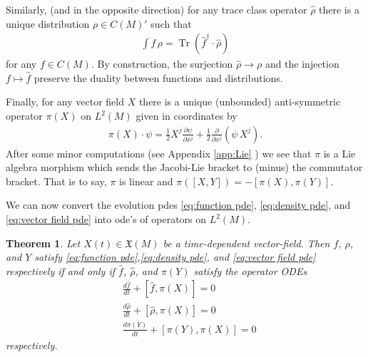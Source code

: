 \documentclass[12pt]{amsart}
\newcommand{\pder}[2]{\ensuremath{\frac{ \partial #1}{\partial #2}}}
\newtheorem{thm}{Theorem}[section]
\DeclareMathOperator{\Tr}{Tr}
\begin{document}
Similarly, (and in the opposite direction) for any trace class operator $\hat{\rho}$ there is a unique distribution $\rho \in C(M)'$ such that 
\begin{align*}
	 \int f \, \rho = \Tr ( \hat{f}^{\dagger} \cdot \hat{\rho} )
\end{align*}
for any $f \in C(M)$.
By construction, the surjection $\hat{\rho} \to \rho$ and the injection $f \mapsto \hat{f}$ preserve the duality between functions and distributions.

Finally, for any vector field $X$ there is a unique (unbounded) anti-symmetric operator $\pi(X)$ on $L^{2}(M)$
given in coordinates by
\begin{align}
	\pi(X) \cdot \psi = \frac{1}{2} X^{j} \pder{\psi}{x^{j}} + \frac{1}{2} \pder{}{x^{j}} ( \psi \, X^{j} ). \label{eq:representation}
\end{align}
After some minor computations (see Appendix \ref{app:Lie}  ) we see that $\pi$ is a Lie algebra morphism which sends
the Jacobi-Lie bracket to (minus) the commutator bracket.  That is to say, $\pi$ is linear and $\pi([X,Y]) = - [ \pi(X) , \pi(Y)]$.

We can now convert the evolution pdes \eqref{eq:function pde}, \eqref{eq:density pde}, and \eqref{eq:vector field pde}
into ode's of operators on $L^{2}(M)$.

\begin{thm} \label{thm:quantize}
	Let $X(t) \in \mathfrak{X}(M)$ be a time-dependent vector-field.
	Then $f$, $\rho$, and $Y$ satisfy \eqref{eq:function pde},\eqref{eq:density pde}, and \eqref{eq:vector field pde} respectively
	if and only if $\hat{f}$, $\hat{\rho}$, and $\pi(Y)$ satisfy the operator ODEs
	\begin{align}
		&\frac{d \hat{f} }{dt} + [ \hat{f} , \pi(X) ] = 0 \label{eq:quantum observable ode} \\
		&\frac{d \hat{\rho} }{dt} + [ \hat{\rho} , \pi(X) ] = 0 \label{eq:quantum density ode} \\
		&\frac{d \pi(Y) }{dt} + [ \pi(Y), \pi(X) ] = 0 \label{eq:quantum vf ode}
	\end{align}
	respectively.
\end{thm}
\end{document}

